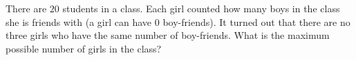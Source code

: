 There are $20$ students in a class. Each girl counted how many boys in the class she is friends with (a girl can have $0$ boy-friends). It turned out that there are no three girls who have the same number of boy-friends. What is the maximum possible number of girls in the class?
